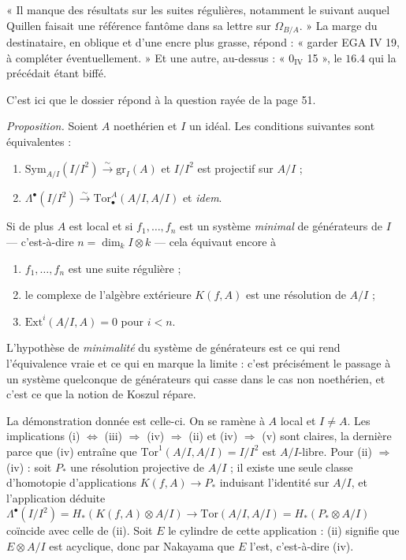 \documentclass[11pt,a4paper]{article}
\begin{document}
« Il manque des résultats sur les suites régulières, notamment le suivant auquel
Quillen faisait une référence fantôme dans sa lettre sur $\Omega_{B/A}$. » La
marge du destinataire, en oblique et d'une encre plus grasse, répond :
« garder EGA IV 19, à compléter éventuellement. » Et une autre, au-dessus :
« $0_{\mathrm{IV}}$ 15 », le $16.4$ qui la précédait étant biffé.

C'est ici que le dossier répond à la question rayée de la page 51.

\emph{Proposition.} Soient $A$ noethérien et $I$ un idéal. Les conditions
suivantes sont équivalentes :

\begin{enumerate}
  \item[(i)] $\mathrm{Sym}_{A/I}(I/I^{2}) \xrightarrow{\sim} \mathrm{gr}_{I}(A)$
  et $I/I^{2}$ est projectif sur $A/I$ ;
  \item[(ii)] $\Lambda^{\bullet}(I/I^{2}) \xrightarrow{\sim}
  \mathrm{Tor}^{A}_{\bullet}(A/I, A/I)$ et \emph{idem}.
\end{enumerate}

Si de plus $A$ est local et si $f_{1},\ldots,f_{n}$ est un système
\emph{minimal} de générateurs de $I$ — c'est-à-dire $n = \dim_{k} I \otimes k$ —
cela équivaut encore à

\begin{enumerate}
  \item[(iii)] $f_{1},\ldots,f_{n}$ est une suite régulière ;
  \item[(iv)] le complexe de l'algèbre extérieure $K(f, A)$ est une résolution
  de $A/I$ ;
  \item[(v)] $\mathrm{Ext}^{i}(A/I, A) = 0$ pour $i < n$.
\end{enumerate}

L'hypothèse de \emph{minimalité} du système de générateurs est ce qui rend
l'équivalence vraie et ce qui en marque la limite : c'est précisément le passage
à un système quelconque de générateurs qui casse dans le cas non noethérien, et
c'est ce que la notion de Koszul répare.

La démonstration donnée est celle-ci. On se ramène à $A$ local et $I \neq A$.
Les implications (i) $\Leftrightarrow$ (iii) $\Rightarrow$ (iv) $\Rightarrow$
(ii) et (iv) $\Rightarrow$ (v) sont claires, la dernière parce que (iv) entraîne
que $\mathrm{Tor}^{1}(A/I, A/I) = I/I^{2}$ est $A/I$-libre. Pour (ii)
$\Rightarrow$ (iv) : soit $P_{*}$ une résolution projective de $A/I$ ; il existe
une seule classe d'homotopie d'applications $K(f,A) \to P_{*}$ induisant
l'identité sur $A/I$, et l'application déduite $\Lambda^{\bullet}(I/I^{2}) =
H_{*}(K(f,A) \otimes A/I) \to \mathrm{Tor}(A/I,A/I) = H_{*}(P_{*} \otimes A/I)$
coïncide avec celle de (ii). Soit $E$ le cylindre de cette application : (ii)
signifie que $E \otimes A/I$ est acyclique, donc par Nakayama que $E$ l'est,
c'est-à-dire (iv).
\end{document}
